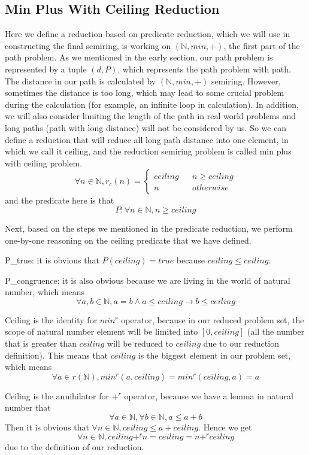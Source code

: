 \documentclass[a4paper,12pt,twoside,openright]{report}
\newcommand{\e}[2]{
\begin{equation}
  \label{#1} 
  #2
\end{equation}
}
\begin{document}
\subsection{Min Plus With Ceiling Reduction}
Here we define a reduction based on predicate reduction, which we will use in constructing the final semiring, is working on $(\mathbb{N},min,+)$, the first part of the path problem. 
As we mentioned in the early section, our path problem is represented by a tuple $(d,P)$, which represents the path problem with path. 
The distance in our path is calculated by $(\mathbb{N},min,+)$ semiring. 
However, sometimes the distance is too long, which may lead to some crucial problem during the calculation (for example, an infinite loop in calculation). In addition, we will also consider limiting the length of the path in real world problems and long paths (path with long distance) will not be considered by us. 
So we can define a reduction that will reduce all long path distance into one element, in which we call it ceiling, and the reduction semiring problem is called min plus with ceiling problem. \e{pr:def:min_plus_ceiling}{\forall n \in \mathbb{N}, r_c(n) = \left\{
\begin{aligned}
ceiling &  & n \geq ceiling \\
n &  & otherwise 
\end{aligned}
\right.} and the predicate here is that \[P : \forall n \in \mathbb{N}, n \geq ceiling\]

Next, based on the steps we mentioned in the predicate reduction, we perform one-by-one reasoning on the ceiling predicate that we have defined.

P\_true: it is obvious that $P(ceiling) = true$ because $ceiling \leq ceiling$.

P\_congruence: it is also obvious because we are living in the world of natural number, which means \[\forall a,b \in \mathbb{N}, a = b \wedge a \leq ceiling \rightarrow b \leq ceiling\]

Ceiling is the identity for $min^r$ operator, because in our reduced problem set, the scope of natural number element will be limited into $[0,ceiling]$ (all the number that is greater than $ceiling$ will be reduced to $ceiling$ due to our reduction definition). This means that $ceiling$ is the biggest element in our problem set, which means \[\forall a \in r(\mathbb{N}), min^r (a,ceiling) = min^r(ceiling,a) = a\]

Ceiling is the annihilator for $+^r$ operator, because we have a lemma in natural number that \[\forall a \in \mathbb{N}, \forall b \in \mathbb{N}, a \leq a + b\] Then it is obvious that $\forall n \in \mathbb{N}, ceiling \leq a + ceiling$. Hence we get \[\forall n \in \mathbb{N}, ceiling +^r n = ceiling = n +^r ceiling\] due to the definition of our reduction.
\end{document}
